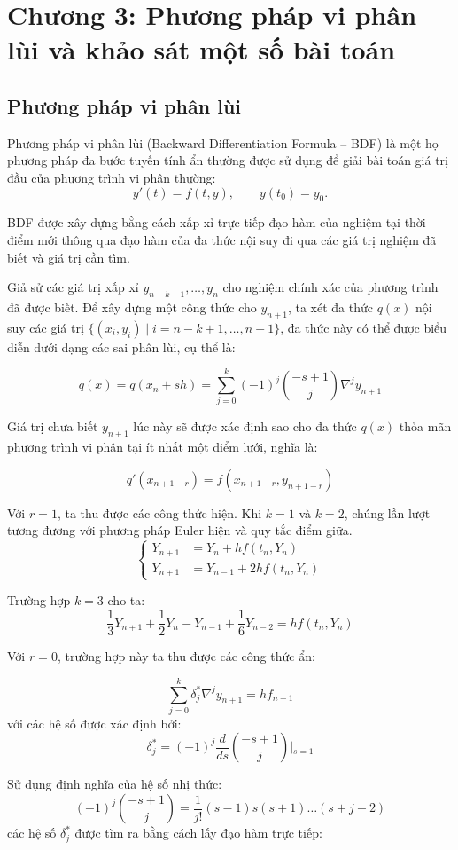 \section{Chương 3: Phương pháp vi phân lùi và khảo sát một số bài toán}
\subsection{Phương pháp vi phân lùi}
Phương pháp vi phân lùi (Backward Differentiation Formula -- BDF) là một họ phương pháp đa bước tuyến tính ẩn thường được sử dụng để giải bài toán giá trị đầu của phương trình vi phân thường:
\[
    y'(t) = f(t,y), \qquad y(t_0) = y_0.
\]

BDF được xây dựng bằng cách xấp xỉ trực tiếp đạo hàm của nghiệm tại thời điểm mới thông qua đạo hàm của đa thức nội suy đi qua các giá trị nghiệm đã biết và giá trị cần tìm.

Giả sử các giá trị xấp xỉ $y_{n-k+1}, \dots, y_n$ cho nghiệm chính xác của phương trình đã được biết. Để xây dựng một công thức cho $y_{n+1}$, ta xét đa thức $q(x)$ nội suy các giá trị $\{(x_i, y_i) \mid i = n-k+1, \dots, n+1\}$, đa thức này có thể được biểu diễn dưới dạng các sai phân lùi, cụ thể là:

$$q(x) = q(x_n + sh) = \sum_{j=0}^k (-1)^j \binom{-s+1}{j} \nabla^j y_{n+1}$$

Giá trị chưa biết $y_{n+1}$ lúc này sẽ được xác định sao cho đa thức $q(x)$ thỏa mãn phương trình vi phân tại ít nhất một điểm lưới, nghĩa là:

$$q'(x_{n+1-r}) = f(x_{n+1-r}, y_{n+1-r})$$

Với $r = 1$, ta thu được các công thức hiện. Khi $k = 1$ và $k = 2$, chúng lần lượt tương đương với phương pháp Euler hiện và quy tắc điểm giữa. 
\[
\left\{
\begin{aligned}
    Y_{n+1} &= Y_n + h f(t_n,Y_n)\\
Y_{n+1} &= Y_{n-1} + 2hf(t_n,Y_n)
\end{aligned}
\right.
\]


Trường hợp $k = 3$ cho ta:
$$\frac{1}{3}Y_{n+1} + \frac{1}{2}Y_n - Y_{n-1} + \frac{1}{6}Y_{n-2} = hf(t_n,Y_n) $$

Với $r = 0$, trường hợp này ta thu được các công thức ẩn:

$$\sum_{j=0}^k \delta_j^* \nabla^j y_{n+1} = hf_{n+1}$$
với các hệ số được xác định bởi:
$$\delta_j^* = (-1)^j \frac{d}{ds} \binom{-s+1}{j} \bigg\vert{}_{s=1}$$

Sử dụng định nghĩa của hệ số nhị thức:
$$(-1)^j \binom{-s+1}{j} = \frac{1}{j!} (s-1)s(s+1)\dots(s+j-2)$$
các hệ số $\delta_j^*$ được tìm ra bằng cách lấy đạo hàm trực tiếp:

